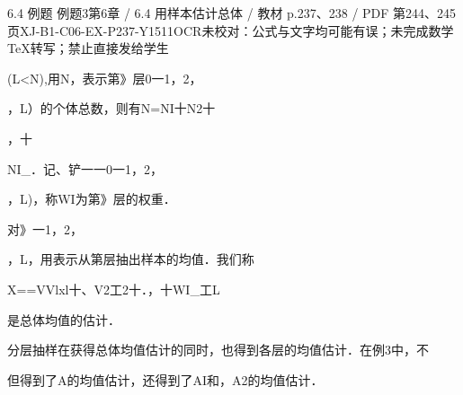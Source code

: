 \begin{bankitem}{6.4 例题 例题3}{第6章 / 6.4 用样本估计总体 / 教材 p.237、238 / PDF 第244、245页}{XJ-B1-C06-EX-P237-Y1511}{OCR未校对：公式与文字均可能有误；未完成数学TeX转写；禁止直接发给学生}
\begin{ocrdraft}
(L<N),用N，表示第》层0一1，2，
\par
，L）的个体总数，则有N=NI十N2十
\par
，十
\par
NI\_．记、铲一一0一1，2，
\par
，L)，称WI为第》层的权重．
\par
对》一1，2，
\par
，L，用表示从第层抽出样本的均值．我们称
\par
X==VVlxl十、V2工2十．，十WI\_工L
\par
是总体均值的估计．
\par
分层抽样在获得总体均值估计的同时，也得到各层的均值估计．在例3中，不
\par
但得到了A的均值估计，还得到了AI和，A2的均值估计．
\end{ocrdraft}
\end{bankitem}
